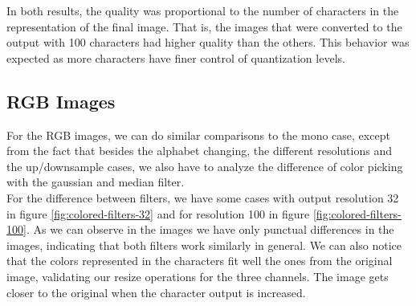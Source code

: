 \documentclass[]{IEEEtran}
\begin{document}

In both results, the quality was proportional to the number of characters in the representation of the final image. That is, the images that were converted to the output with 100 characters had higher quality than the others. This behavior was expected as more characters have finer control of quantization levels.


\subsection{RGB Images}

For the RGB images, we can do similar comparisons to the mono case, except from the fact that besides the alphabet changing, the different resolutions and the up/downsample cases, we also have to analyze the difference of color picking with the gaussian and median filter. 
\\For the difference between filters, we have some cases with output resolution 32 in figure \ref{fig:colored-filters-32} and for resolution 100 in figure \ref{fig:colored-filters-100}. As we can observe in the images we have only punctual differences in the images, indicating that both filters work similarly in general. We can also notice that the colors represented in the characters fit well the ones from the original image, validating our resize operations for the three channels. The image gets closer to the original when the character output is increased.

\end{document}
